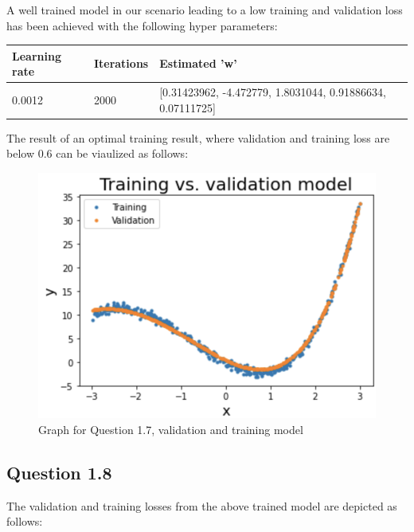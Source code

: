 \documentclass{article}
\begin{document}
A well trained model in our scenario leading to a low training and validation loss has been achieved with the following hyper parameters:

\begin{center}
    \begin{tabular}{|l|l|l|}
    \hline
          Learning rate & Iterations & Estimated 'w' \\
          \hline
         0.0012&2000&[0.31423962, -4.472779, 1.8031044, 0.91886634, 0.07111725] \\
    \hline
    \end{tabular}
\end{center}

The result of an optimal training result, where validation and training loss are below 0.6 can be viaulized as follows:

\begin{figure}[!htb]
\centering
\includegraphics[scale = 0.7]{Question7_Graph.png}
\caption{\label{fig:fig}Graph for Question 1.7, validation and training model}
\end{figure}

\newpage

\subsection{Question 1.8}

The validation and training losses from the above trained model are depicted as follows:
\end{document}

